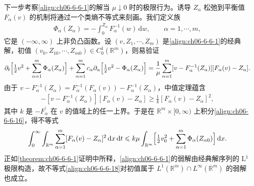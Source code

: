 \documentclass[../../main.tex]{subfiles}
\begin{document}
下一步考察\eqref{align:ch06-6-6-1}的解当 $\mu\downarrow 0$ 时的极限行为。诱导 $Z_{\alpha}$ 松弛到平衡值 $F_{\alpha}(v)$ 的机制将通过一个类熵不等式来刻画。我们定义族
\begin{align}
\Phi_{\alpha}(Z_{\alpha})=-\int_{0}^{Z_{\alpha}}F_{\alpha}^{-1}(w)\,\mathrm{d}w,\qquad \alpha=1,\cdots,m,
\label{align:ch06-6-6-15}
\end{align}
它是 $(-\infty,\infty)$ 上非负凸函数。设 $(v,Z_{1},\cdots,Z_{m})$ 是\eqref{align:ch06-6-6-1}的经典解，初值 $(v_{0},Z_{10},\cdots,Z_{m0})\in C_{0}^{1}(\mathbb{R}^{m})$，则易验证
\begin{align}
\partial_{t}\Bigl{[}\tfrac{1}{2}v^{2}+\sum_{\alpha=1}^{m}\Phi_{\alpha}(Z_{\alpha})\Bigr{]}+\sum_{\alpha=1}^{m}c_{\alpha}\partial_{\alpha}\Bigl{[}\tfrac{1}{2}v^{2}-\Phi_{\alpha}(Z_{\alpha})\Bigr{]}
=\frac{1}{\mu}\sum_{\alpha=1}^{m}[v-F_{\alpha}^{-1}(Z_{\alpha})][F_{\alpha}(v)-Z_{\alpha}].
\label{align:ch06-6-6-16}
\end{align}
由于 $v-F_{\alpha}^{-1}(Z_{\alpha})=F_{\alpha}^{-1}(F_{\alpha}(v))-F_{\alpha}^{-1}(Z_{\alpha})$，中值定理蕴含
\begin{align}
-[v-F_{\alpha}^{-1}(Z_{\alpha})][F_{\alpha}(v)-Z_{\alpha}]\geqslant\frac{1}{k}[F_{\alpha}(v)-Z_{\alpha}]^{2},
\label{align:ch06-6-6-17}
\end{align}
其中 $k$ 是 $-F_{\alpha}^{\prime}$ 在 $v$ 的值域上的任一上界。于是在 $\mathbb{R}^{m}\times[0,\infty)$ 上积分\eqref{align:ch06-6-6-16}，得不等式
\begin{align}
\int_{0}^{\infty}\int_{\mathbb{R}^{m}}\sum_{\alpha=1}^{m}[F_{\alpha}(v)-Z_{\alpha}]^{2}\,\mathrm{d}x\,\mathrm{d}t\leqslant k\mu\int_{\mathbb{R}^{m}}\Bigl{[}\tfrac{1}{2}v_{0}^{2}+\sum_{\alpha=1}^{m}\Phi_{\alpha}(Z_{\alpha 0})\Bigr{]}\,\mathrm{d}x.
\label{align:ch06-6-6-18}
\end{align}
正如\cref{theorem:ch06-6-6-1}证明中所释，\eqref{align:ch06-6-6-1}的弱解由经典解序列的 L$^{1}$ 极限构造，故不等式\eqref{align:ch06-6-6-18}对初值属于 $L^{1}(\mathbb{R}^{m})\cap L^{\infty}(\mathbb{R}^{m})$ 的弱解也成立。
\end{document}
